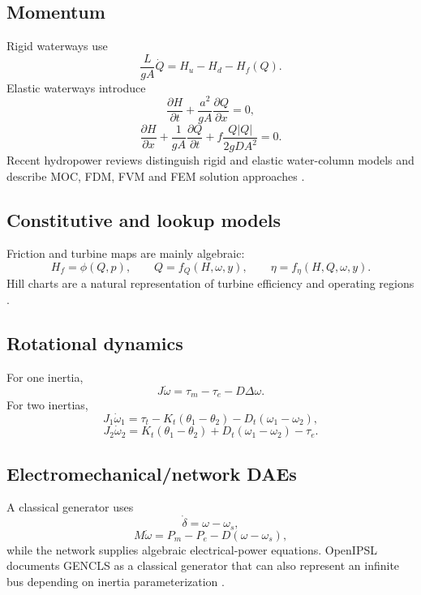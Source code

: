 \documentclass[10pt,a4paper]{article}
\begin{document}
\subsection{Momentum}
Rigid waterways use
\[
\boxed{\frac{L}{gA}\dot Q=H_u-H_d-H_f(Q)}.
\]
Elastic waterways introduce
\[
\frac{\partial H}{\partial t}+\frac{a^2}{gA}\frac{\partial Q}{\partial x}=0,
\]
\[
\frac{\partial H}{\partial x}+\frac{1}{gA}\frac{\partial Q}{\partial t}
+f\frac{Q|Q|}{2gDA^2}=0.
\]
Recent hydropower reviews distinguish rigid and elastic water-column models and describe MOC, FDM, FVM and FEM solution approaches \cite{WaterHammerReview}.

\subsection{Constitutive and lookup models}
Friction and turbine maps are mainly algebraic:
\[
H_f=\phi(Q,p),\qquad Q=f_Q(H,\omega,y),\qquad \eta=f_\eta(H,Q,\omega,y).
\]
Hill charts are a natural representation of turbine efficiency and operating regions \cite{HillCharts}.

\subsection{Rotational dynamics}
For one inertia,
\[
\boxed{J\dot\omega=\tau_m-\tau_e-D\Delta\omega}.
\]
For two inertias,
\[
J_1\dot\omega_1=\tau_t-K_t(\theta_1-\theta_2)-D_t(\omega_1-\omega_2),
\]
\[
J_2\dot\omega_2=K_t(\theta_1-\theta_2)+D_t(\omega_1-\omega_2)-\tau_e.
\]

\subsection{Electromechanical/network DAEs}
A classical generator uses
\[
\dot\delta=\omega-\omega_s,
\]
\[
M\dot\omega=P_m-P_e-D(\omega-\omega_s),
\]
while the network supplies algebraic electrical-power equations. OpenIPSL documents GENCLS as a classical generator that can also represent an infinite bus depending on inertia parameterization \cite{GENCLS}.
\end{document}
